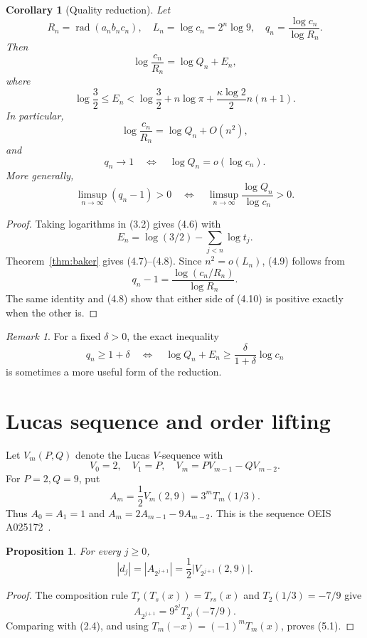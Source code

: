 \documentclass[11pt]{article}
\newtheorem{proposition}[theorem]{Proposition}
\newtheorem{corollary}[theorem]{Corollary}
\theoremstyle{remark}
\newtheorem{remark}[theorem]{Remark}
\newcommand{\rad}{\operatorname{rad}}
\begin{document}
\begin{corollary}[Quality reduction]\label{cor:quality}
Let
\[
 R_n=\rad(a_nb_nc_n),\quad L_n=\log c_n=2^n\log9,\quad
 q_n=\frac{\log c_n}{\log R_n}.
\]
Then
\[
 \log\frac{c_n}{R_n}=\log Q_n+E_n,                         \tag{4.6}
\]
where
\[
 \log\frac32\leq E_n
 <\log\frac32+n\log\pi+
   \frac{\kappa\log2}{2}n(n+1).                            \tag{4.7}
\]
In particular,
\[
 \log\frac{c_n}{R_n}=\log Q_n+O(n^2),                     \tag{4.8}
\]
and
\[
 q_n\longrightarrow1
 \quad\Longleftrightarrow\quad
 \log Q_n=o(\log c_n).                                     \tag{4.9}
\]
More generally,
\[
 \limsup_{n\to\infty}(q_n-1)>0
 \quad\Longleftrightarrow\quad
 \limsup_{n\to\infty}\frac{\log Q_n}{\log c_n}>0.          \tag{4.10}
\]
\end{corollary}

\begin{proof}
Taking logarithms in (3.2) gives (4.6) with
\[
 E_n=\log(3/2)-\sum_{j<n}\log t_j.
\]
Theorem~\ref{thm:baker} gives (4.7)--(4.8).  Since \(n^2=o(L_n)\),
(4.9) follows from
\[
 q_n-1=\frac{\log(c_n/R_n)}{\log R_n}.
\]
The same identity and (4.8) show that either side of (4.10) is positive
exactly when the other is.
\end{proof}

\begin{remark}
For a fixed \(\delta>0\), the exact inequality
\[
 q_n\geq1+\delta
 \quad\Longleftrightarrow\quad
 \log Q_n+E_n\geq\frac{\delta}{1+\delta}\log c_n
\]
is sometimes a more useful form of the reduction.
\end{remark}

\section{Lucas sequence and order lifting}

Let \(V_m(P,Q)\) denote the Lucas \(V\)-sequence with
\[
 V_0=2,\quad V_1=P,\quad V_m=PV_{m-1}-QV_{m-2}.
\]
For \(P=2,Q=9\), put
\[
 A_m=\frac12V_m(2,9)=3^mT_m(1/3).
\]
Thus \(A_0=A_1=1\) and \(A_m=2A_{m-1}-9A_{m-2}\).  This is the sequence
OEIS A025172~\cite{OEIS-A025172}.

\begin{proposition}\label{prop:lucas}
For every \(j\geq0\),
\[
 |d_j|=|A_{2^{j+1}}|
      =\frac12\bigl|V_{2^{j+1}}(2,9)\bigr|.                \tag{5.1}
\]
\end{proposition}

\begin{proof}
The composition rule \(T_r(T_s(x))=T_{rs}(x)\) and
\(T_2(1/3)=-7/9\) give
\[
 A_{2^{j+1}}
 =9^{2^j}T_{2^j}(-7/9).
\]
Comparing with (2.4), and using \(T_m(-x)=(-1)^mT_m(x)\), proves (5.1).
\end{proof}
\end{document}
